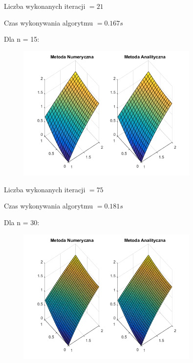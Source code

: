 Liczba wykonanych iteracji $ = 21 $

Czas wykonywania algorytmu $ = 0.167 s$

Dla n = 15:

\begin{figure}[!ht]
	\begin{center}
		\includegraphics[width=0.8\textwidth]{Lab6/charts/gs/zad1/15.png}
	\end{center}
\end{figure}

Liczba wykonanych iteracji $ = 75 $

Czas wykonywania algorytmu $ = 0.181 s$

Dla n = 30:

\begin{figure}[!ht]
	\begin{center}
		\includegraphics[width=0.8\textwidth]{Lab6/charts/gs/zad1/30.png}
	\end{center}
\end{figure}

